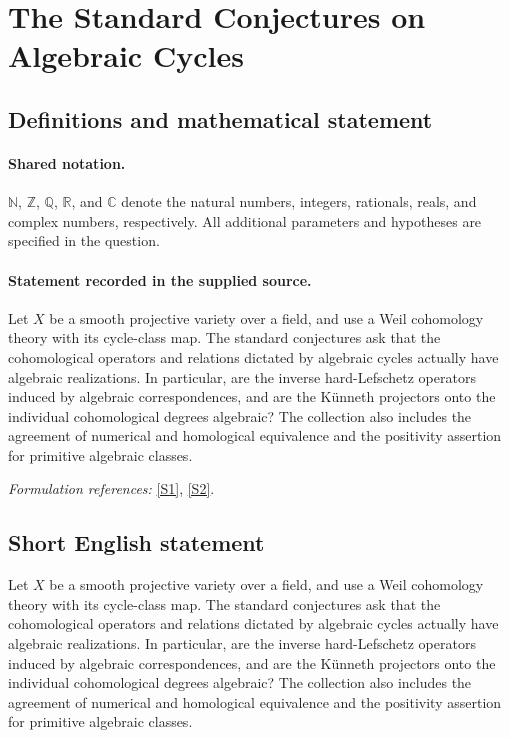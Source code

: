 \documentclass[11pt]{article}
\newcommand{\sref}[2]{\hyperlink{source:#1:#2}{[S#2]}}
\begin{document}
\section{The Standard Conjectures on Algebraic Cycles}\label{statement}

\subsection{Definitions and mathematical statement}

\paragraph{Shared notation.}$\mathbb N$, $\mathbb Z$, $\mathbb Q$, $\mathbb R$, and $\mathbb C$ denote the natural numbers, integers, rationals, reals, and complex numbers, respectively. All additional parameters and hypotheses are specified in the question.


\paragraph{Statement recorded in the supplied source.}
Let $X$ be a smooth projective variety over a field, and use a Weil cohomology theory with its cycle-class map. The standard conjectures ask that the cohomological operators and relations dictated by algebraic cycles actually have algebraic realizations. In particular, are the inverse hard-Lefschetz operators induced by algebraic correspondences, and are the K\"unneth projectors onto the individual cohomological degrees algebraic? The collection also includes the agreement of numerical and homological equivalence and the positivity assertion for primitive algebraic classes.
\par\smallskip\textit{Formulation references:} \sref{statement}{1}, \sref{statement}{2}.
\subsection{Short English statement}
Let $X$ be a smooth projective variety over a field, and use a Weil cohomology theory with its cycle-class map. The standard conjectures ask that the cohomological operators and relations dictated by algebraic cycles actually have algebraic realizations. In particular, are the inverse hard-Lefschetz operators induced by algebraic correspondences, and are the K\"unneth projectors onto the individual cohomological degrees algebraic? The collection also includes the agreement of numerical and homological equivalence and the positivity assertion for primitive algebraic classes.
\end{document}
